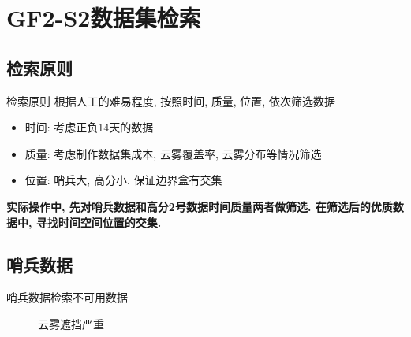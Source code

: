 \section{GF2-S2数据集检索}

\subsection{检索原则}
\begin{frame}{检索原则}
    根据人工的难易程度, 按照时间, 质量, 位置, 依次筛选数据
    \begin{itemize}
        \item 时间: 考虑正负14天的数据
        \item 质量: 考虑制作数据集成本, 云雾覆盖率, 云雾分布等情况筛选
        \item 位置: 哨兵大, 高分小. 保证边界盒有交集
    \end{itemize}
    
    \textbf{实际操作中, 先对哨兵数据和高分2号数据时间质量两者做筛选. 在筛选后的优质数据中, 寻找时间空间位置的交集.}
\end{frame}

\subsection{哨兵数据}
\begin{frame}{哨兵数据检索}{不可用数据}
    \begin{figure}[!htbp]
        \centering
        \quad
        \caption{云雾遮挡严重}
        \label{fig:0104}
    \end{figure}
\end{frame}

